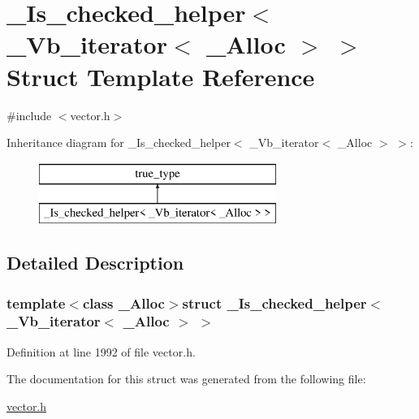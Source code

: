 \hypertarget{struct___is__checked__helper_3_01___vb__iterator_3_01___alloc_01_4_01_4}{\section{\+\_\+\+Is\+\_\+checked\+\_\+helper$<$ \+\_\+\+Vb\+\_\+iterator$<$ \+\_\+\+Alloc $>$ $>$ Struct Template Reference}
\label{struct___is__checked__helper_3_01___vb__iterator_3_01___alloc_01_4_01_4}
}


{\ttfamily \#include $<$vector.\+h$>$}

Inheritance diagram for \+\_\+\+Is\+\_\+checked\+\_\+helper$<$ \+\_\+\+Vb\+\_\+iterator$<$ \+\_\+\+Alloc $>$ $>$\+:\begin{figure}[H]
\begin{center}
\leavevmode
\includegraphics[height=2.000000cm]{struct___is__checked__helper_3_01___vb__iterator_3_01___alloc_01_4_01_4}
\end{center}
\end{figure}


\subsection{Detailed Description}
\subsubsection*{template$<$class \+\_\+\+Alloc$>$struct \+\_\+\+Is\+\_\+checked\+\_\+helper$<$ \+\_\+\+Vb\+\_\+iterator$<$ \+\_\+\+Alloc $>$ $>$}



Definition at line 1992 of file vector.\+h.



The documentation for this struct was generated from the following file\+:\begin{DoxyCompactItemize}
\item 
\hyperlink{vector_8h}{vector.\+h}\end{DoxyCompactItemize}
